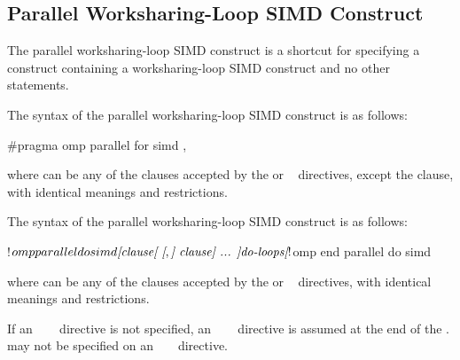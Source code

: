\subsection{Parallel Worksharing-Loop SIMD Construct}
\label{subsec:Parallel Worksharing-Loop SIMD Construct}
\summary
The parallel worksharing-loop SIMD construct is a shortcut for specifying a 
 construct containing a worksharing-loop SIMD construct and 
no other statements.

\begin{samepage}
\syntax
\begin{ccppspecific}
The syntax of the parallel worksharing-loop SIMD construct is as follows:

\begin{ompcPragma}
#pragma omp parallel for simd \plc{[clause[ [},\plc{] clause] ... ] new-line}
\end{ompcPragma}

where  can be any of the clauses accepted by the 
or ~ directives, except the  clause, with
identical meanings and restrictions.
\end{ccppspecific}
\end{samepage}

\begin{fortranspecific}
\begin{samepage}
The syntax of the parallel worksharing-loop SIMD construct is as follows:

\begin{ompfPragma}
!$omp parallel do simd \plc{[clause[ [},\plc{] clause] ... ]}
    \plc{do-loops}
\plc{[}!$omp end parallel do simd\plc{]}
\end{ompfPragma}
\end{samepage}

where  can be any of the clauses accepted by the 
or ~ directives, with identical meanings and restrictions.

\begin{samepage}
If an ~~~ directive is not specified, an
~~~ directive is assumed at the end of the
.  may not be specified on
an ~ ~ directive.
\end{samepage}
\end{fortranspecific}

